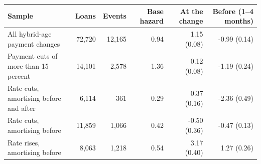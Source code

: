 \begin{tabular}{lrrrrr}
\toprule
Sample & Loans & Events & Base hazard & At the change & Before (1--4 months) \\
\midrule
All hybrid-age payment changes & 72,720 & 12,165 & 0.94 & 1.15 (0.08) & -0.99 (0.14) \\
Payment cuts of more than 15 percent & 14,101 & 2,578 & 1.36 & 0.12 (0.08) & -1.19 (0.24) \\
Rate cuts, amortising before and after & 6,114 & 361 & 0.29 & 0.37 (0.16) & -2.36 (0.49) \\
Rate cuts, amortising before & 11,859 & 1,066 & 0.42 & -0.50 (0.36) & -0.47 (0.13) \\
Rate rises, amortising before & 8,063 & 1,218 & 0.54 & 3.17 (0.40) & 1.27 (0.26) \\
\bottomrule
\end{tabular}
